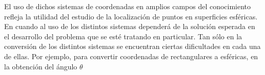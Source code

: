 El uso de dichos sistemas de coordenadas en amplios campos del conocimiento refleja la utilidad del estudio de la localización de puntos en superficies esféricas. En cuando al uso de los distintos sistemas dependerá de la solución esperada en el desarrollo del problema que se esté tratando en particular. Tan sólo en la conversión de los distintos sistemas se encuentran ciertas dificultades en cada una de ellas. Por ejemplo, para convertir coordenadas de rectangulares a esféricas, en la obtención del ángulo ${\theta}$
